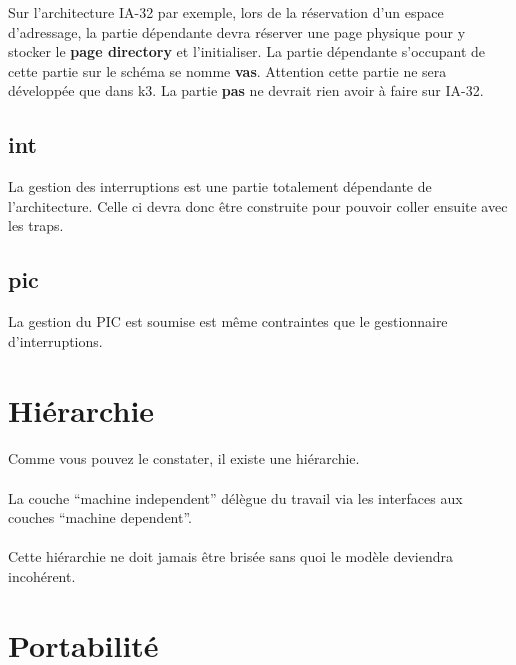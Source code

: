 \documentclass[10pt,a4wide]{article}
\begin{document}
Sur l'architecture IA-32 par exemple, lors de la r\'eservation
d'un espace d'adressage, la partie d\'ependante devra r\'eserver une page
physique pour y stocker le \textbf{page directory} et l'initialiser. La
partie d\'ependante s'occupant de cette partie sur le sch\'ema se nomme
\textbf{vas}. Attention cette partie ne sera d\'evelopp\'ee que dans k3.
La partie \textbf{pas} ne devrait rien avoir \`a faire sur IA-32.

\subsection{int}

La gestion des interruptions est une partie totalement d\'ependante de
l'architecture. Celle ci devra donc \^etre construite pour pouvoir
coller ensuite avec les traps.

\subsection{pic}

La gestion du PIC est soumise est m\^eme contraintes que le gestionnaire
d'interruptions.

\section{Hi\'erarchie}

\paragraph{}

Comme vous pouvez le constater, il existe une hi\'erarchie.

\paragraph{}

La couche ``machine independent'' d\'el\`egue du travail via les interfaces
aux couches ``machine dependent''.

\paragraph{}

Cette hi\'erarchie ne doit jamais \^etre bris\'ee sans quoi le mod\`ele
deviendra incoh\'erent.

\section{Portabilit\'e}
\end{document}
